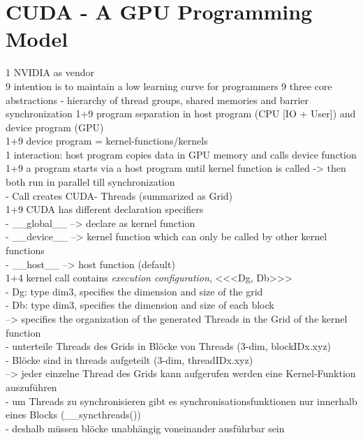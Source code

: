 \documentclass[a4paper,12pt]{llncs}
\numberwithin{equation}{section}
\begin{document}
\section{CUDA - A GPU Programming Model}
      1 NVIDIA as vendor\\
      9 intention is to maintain a low learning curve for programmers
      9 three core abstractions - hierarchy of thread groups, shared memories and barrier synchronization
      1+9 program separation in host program (CPU [IO + User]) and device program (GPU)\\
      1+9 device program = kernel-functions/kernels\\
	  1 interaction: host program copies data in GPU memory and calls device function\\
	  1+9 a program starts via a host program until kernel function is called -> then both run in parallel till synchronization\\
		- Call creates CUDA- Threads (summarized as Grid)\\
	  1+9 CUDA has different declaration specifiers\\
        - \_\_global\_\_ --> declare as kernel function\\
        - \_\_device\_\_ --> kernel function which can only be called by other kernel functions\\
        - \_\_host\_\_ --> host function (default)\\
	  1+4 kernel call contains \textit{execution configuration}, <<<Dg, Db>>>\\
   	    - Dg: type dim3, specifies the dimension and size of the grid\\
   	    - Db: type dim3, specifies the dimension and size of each block\\
	    --> specifies the organization of the generated Threads in the Grid of the kernel function\\
	  	  - unterteile Threads des Grids in Blöcke von Threads (3-dim, blockIDx.xyz)\\
	  	  - Blöcke sind in threads aufgeteilt (3-dim, threadIDx.xyz)\\
	   --> jeder einzelne Thread des Grids kann aufgerufen werden eine Kernel-Funktion auszuführen\\
          - um Threads zu synchronisieren gibt es synchronisationsfunktionen nur innerhalb eines Blocks (\_\_syncthreads())\\
          - deshalb müssen blöcke unabhängig voneinander ausführbar sein\\
  
\end{document}
